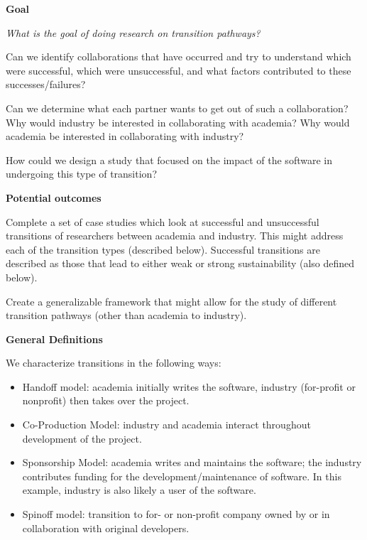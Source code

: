 \textbf{Goal}

\emph{What is the goal of doing research on transition pathways?} 

Can we identify collaborations that have occurred and try to understand which were successful, which were unsuccessful, and what factors contributed to these successes/failures? 

Can we determine what each partner wants to get out of such a collaboration?
Why would industry be interested in collaborating with academia? 
Why would academia be interested in collaborating with industry?

How could we design a study that focused on the impact of the software in
undergoing this type of transition?

\textbf{Potential outcomes}

Complete a set of case studies which look at successful and unsuccessful
transitions of researchers between academia and industry. This might address 
each of the transition types (described below). Successful transitions are
described as those that lead to either weak or strong sustainability (also
defined below).

Create a generalizable framework that might allow for the study of different
transition pathways (other than academia to industry).

\textbf{General Definitions}

We characterize transitions in the following ways:
\begin{itemize}

\item Handoff model: academia initially writes the software, industry (for-profit 
or nonprofit) then takes over the project.

\item Co-Production Model: industry and academia interact throughout development
of the project.

\item Sponsorship Model: academia writes and maintains the software; the
industry contributes funding for the development\slash maintenance of software.
In this example, industry is also likely a user of the software.

\item Spinoff model: transition to for- or non-profit company owned by or in
collaboration with original developers.

\end{itemize}

